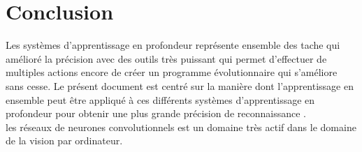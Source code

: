 \documentclass[12pt]{report}
\begin{document}
\newpage
\section{Conclusion}
Les systèmes d'apprentissage en profondeur représente ensemble des tache qui amélioré la précision avec des outils très puissant qui permet d'effectuer de multiples actions encore de créer un programme évolutionnaire qui s'améliore sans cesse. Le présent document est centré sur la manière dont l'apprentissage en ensemble peut être appliqué à ces différents systèmes d'apprentissage en profondeur pour obtenir une plus grande précision de reconnaissance \cite{ref17}.\\
les réseaux de neurones convolutionnels est un domaine très actif dans le domaine de la vision par ordinateur.

\newpage


\end{document}
